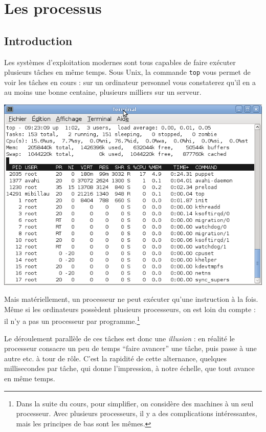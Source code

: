\chapter{Les processus}
\begin{multicols}{2}
\section{Introduction}

Les systèmes d'exploitation modernes sont tous capables de faire
exécuter plusieurs tâches en même temps.  Sous Unix, la commande
\texttt{top} vous permet de voir les tâches en cours : sur un
ordinateur personnel vous constaterez qu'il en a au moins une bonne
centaine, plusieurs milliers sur un serveur.

\includegraphics[width=\linewidth]{memoire-images/top.png} 

Mais matériellement, un processeur ne peut exécuter qu'une instruction
à la fois. Même si les ordinateurs possèdent plusieurs processeurs, on
est loin du compte : il n'y a pas un processeur par
programme.\footnote{Dans la suite du cours, pour simplifier, on
  considère des machines à un seul processeur. Avec plusieurs processeurs,
il y a des complications intéressantes, mais les principes de bas sont les mêmes.}


Le déroulement parallèle de ces tâches est donc une \emph{illusion} : en
réalité le processeur consacre un peu de temps ``faire avancer'' une
tâche, puis passe à une autre etc. à tour de rôle.  C'est la rapidité
de cette alternance, quelques millisecondes par tâche, qui donne
l'impression, à notre échelle, que tout avance en même temps.


\end{multicols}
